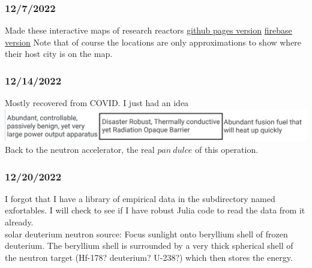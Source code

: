 \documentclass[12pt]{article}
\begin{document}
\subsubsection{12/7/2022}
Made these interactive maps of research reactors
\href{https://marcosp7635.github.io/plots/reactor_map.html}{github pages version}
\href{https://mp7635plots.web.app/reactor_map.html}{firebase version}
Note that of course the locations are only approximations to show where their host city is on the map. 
\subsubsection{12/14/2022}
Mostly recovered from COVID. I just had an idea\\
\includegraphics[]{Images/combined_fission_fusion_reactor.PNG}\\
Back to the neutron accelerator, the real $pan \ dulce$ of this operation. 
\subsubsection{12/20/2022}
I forgot that I have a library of empirical data in the subdirectory named exfortables. I will check to see if I have robust Julia code to read the data from it already. \\
solar deuterium neutron source:
Focus sunlight onto beryllium shell of frozen deuterium. The beryllium shell is surrounded by a very thick spherical shell of the neutron target (Hf-178? deuterium? U-238?) which then stores the energy.
\end{document}
